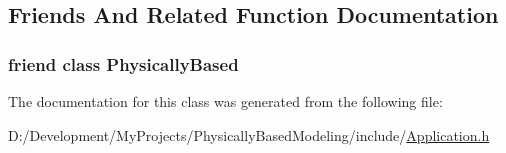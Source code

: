 \subsection{Friends And Related Function Documentation}
\hypertarget{class_application_aeee6bd23afed3d408fb21a7d857a8f3b}{
\subsubsection[{Physically\-Based}]{\setlength{\rightskip}{0pt plus 5cm}friend class Physically\-Based\hspace{0.3cm}{\ttfamily [friend]}}}\label{class_application_aeee6bd23afed3d408fb21a7d857a8f3b}


The documentation for this class was generated from the following file\-:\begin{DoxyCompactItemize}
\item 
D\-:/\-Development/\-My\-Projects/\-Physically\-Based\-Modeling/include/\hyperlink{_application_8h}{Application.\-h}\end{DoxyCompactItemize}

